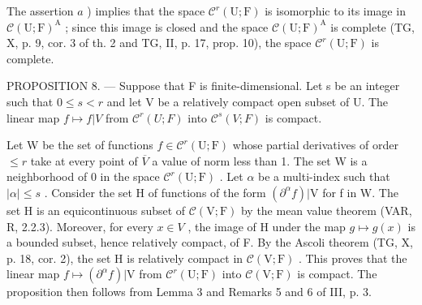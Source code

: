 The assertion \(a\) ) implies that the space \(\mathcal{C}^{r}(\mathrm{U};\mathrm{F})\) is isomorphic to its image in \(\mathcal{C}(\mathrm{U};\mathrm{F})^{\mathrm{A}}\) ; since this image is closed and the space \(\mathcal{C}(\mathrm{U};\mathrm{F})^{\mathrm{A}}\) is complete (TG, X, p. 9, cor. 3 of th. 2 and TG, II, p. 17, prop. 10), the space \(\mathcal{C}^{r}(\mathrm{U};\mathrm{F})\) is complete.

PROPOSITION 8. --- Suppose that F is finite-dimensional. Let s be an integer such that \(0 \leqslant s < r\) and let V be a relatively compact open subset of U. The linear map \(f \mapsto f|V\) from \(\mathcal{C}^{r}(U;F)\) into \(\mathcal{C}^{s}(V;F)\) is compact.

Let W be the set of functions \(f \in \mathcal{C}^{r}(\mathrm{U};\mathrm{F})\) whose partial derivatives of order \(\leqslant r\) take at every point of \(\overline{V}\) a value of norm less than 1. The set W is a neighborhood of 0 in the space \(\mathcal{C}^{r}(\mathrm{U};\mathrm{F})\) . Let \(\alpha\) be a multi-index such that \(|\alpha| \leqslant s\) . Consider the set H of functions of the form \((\partial^{\alpha}f)|\mathrm{V}\) for f in W. The set H is an equicontinuous subset of \(\mathcal{C}(\mathrm{V};\mathrm{F})\) by the mean value theorem (VAR, R, 2.2.3). Moreover, for every \(x \in V\) , the image of H under the map \(g \mapsto g(x)\) is a bounded subset, hence relatively compact, of F. By the Ascoli theorem (TG, X, p. 18, cor. 2), the set H is relatively compact in \(\mathcal{C}(\mathrm{V};\mathrm{F})\) . This proves that the linear map \(f \mapsto (\partial^{\alpha}f)|\mathrm{V}\) from \(\mathcal{C}^{r}(\mathrm{U};\mathrm{F})\) into \(\mathcal{C}(\mathrm{V};\mathrm{F})\) is compact. The proposition then follows from Lemma 3 and Remarks 5 and 6 of III, p. 3.

